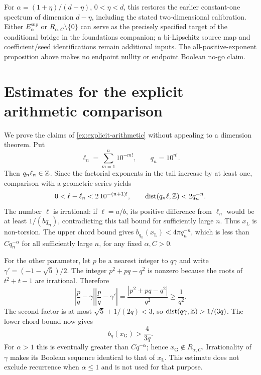 \documentclass[11pt,a4paper]{article}
\begin{document}
For $\alpha=(1+\eta)/(d-\eta)$, $0<\eta<d$, this restores the earlier
constant-one spectrum of dimension $d-\eta$, including the stated
two-dimensional calibration.  Either $E^{\mathrm{sup}}_\alpha$ or
$R_{\alpha,C}\setminus\{0\}$ can serve as the precisely specified
target of the conditional bridge in the foundations companion; a
bi-Lipschitz source map and coefficient/seed identifications remain
additional inputs.  The all-positive-exponent proposition above makes no
endpoint nullity or endpoint Boolean no-go claim.

\section{Estimates for the explicit arithmetic comparison}
\label{sec:explicit-estimates}

We prove the claims of \cref{ex:explicit-arithmetic} without appealing
to a dimension theorem.  Put
\[
 \ell_n=\sum_{m=1}^n10^{-m!},\qquad q_n=10^{n!}.
\]
Then $q_n\ell_n\in\mathbb Z$.  Since the factorial exponents in the tail
increase by at least one, comparison with a geometric series yields
\[
 0<\ell-\ell_n<2\,10^{-(n+1)!},\qquad
 \operatorname{dist}(q_n\ell,\mathbb Z)<2q_n^{-n}.
\]
The number $\ell$ is irrational: if $\ell=a/b$, its positive difference
from $\ell_n$ would be at least $1/(bq_n)$, contradicting this tail
bound for sufficiently large $n$.  Thus $x_{\mathrm L}$ is non-torsion.
The upper chord bound gives
$b_{q_n}(x_{\mathrm L})<4\pi q_n^{-n}$, which is less than
$Cq_n^{-\alpha}$ for all sufficiently large $n$, for any fixed
$\alpha,C>0$.

For the other parameter, let $p$ be a nearest integer to $q\gamma$ and
write $\gamma'=(-1-\sqrt5)/2$.  The integer $p^2+pq-q^2$ is nonzero
because the roots of $t^2+t-1$ are irrational.  Therefore
\[
 \left|\frac pq-\gamma\right|
 \left|\frac pq-\gamma'\right|
 =\frac{|p^2+pq-q^2|}{q^2}\geq\frac1{q^2}.
\]
The second factor is at most $\sqrt5+1/(2q)<3$, so
$\operatorname{dist}(q\gamma,\mathbb Z)>1/(3q)$.  The lower chord bound now gives
\[
 b_q(x_{\mathrm G})>\frac4{3q}.
\]
For $\alpha>1$ this is eventually greater than $Cq^{-\alpha}$;
hence $x_{\mathrm G}\notin R_{\alpha,C}$.  Irrationality of $\gamma$
makes its Boolean sequence identical to that of $x_{\mathrm L}$.
This estimate does not exclude recurrence when $\alpha\leq1$ and is
not used for that purpose.

\clearpage


\end{document}
